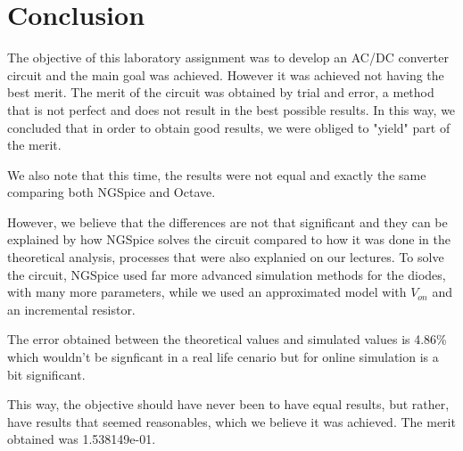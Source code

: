 \newpage
\section{Conclusion}
\label{sec:conclusion}


The objective of this laboratory assignment was to develop an AC/DC converter circuit and the main goal was achieved. However it was achieved not having the best merit. The merit of the circuit was obtained by trial and error, a method that is not perfect and does not result in the best possible results. In this way, we concluded that in order to obtain good results, we were obliged to "yield" part of the merit.

We also note that this time, the results were not equal and exactly the same comparing both NGSpice and Octave.

However, we believe that the differences are not that significant and they can be explained by how NGSpice solves the circuit compared to how it was done in the theoretical analysis, processes that were also explanied on our lectures. To solve the circuit, NGSpice used far more advanced simulation methods for the diodes, with many more parameters, while we used an approximated model with $V_{on}$ and an incremental resistor. 

The error obtained between the theoretical values and simulated values is 4.86\% which wouldn't be signficant in a real life cenario but for online simulation is a bit significant.

This way, the objective should have never been to have equal results, but rather, have results that seemed reasonables, which we believe it was achieved. The merit obtained was 1.538149e-01.

